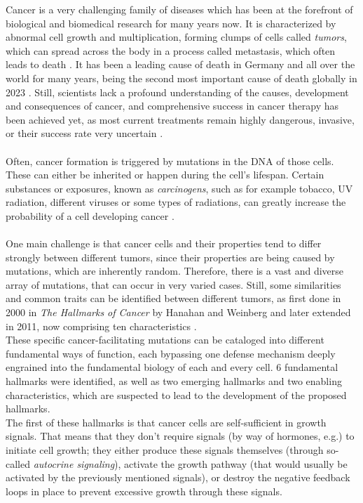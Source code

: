 Cancer is a very challenging family of diseases which has been at the forefront of biological and biomedical research for many years now. It is characterized by abnormal cell growth and multiplication, forming clumps of cells called \textit{tumors}, which can spread across the body in a process called metastasis, which often leads to death \cite{who-cancer}. It has been a leading cause of death in Germany and all over the world for many years, being the second most important cause of death globally in 2023 \cite{owid-causes-of-death}. Still, scientists lack a profound understanding of the causes, development and consequences of cancer, and comprehensive success in cancer therapy has been achieved yet, as most current treatments remain highly dangerous, invasive, or their success rate very uncertain \cite{side-effects-cancer-treatments, who-cancer} .\\~\\
Often, cancer formation is triggered by mutations in the DNA of those cells. These can either be inherited or happen during the cell's lifespan. Certain substances or exposures, known as \textit{carcinogens}, such as for example tobacco, UV radiation, different viruses or some types of radiations, can greatly increase the probability of a cell developing cancer \cite{carcinogens}.\\~\\
One main challenge is that cancer cells and their properties tend to differ strongly between different tumors, since their properties are being caused by mutations, which are inherently random. Therefore, there is a vast and diverse array of mutations, that can occur in very varied cases. Still, some similarities and common traits can be identified between different tumors, as first done in 2000 in \textit{The Hallmarks of Cancer} by Hanahan and Weinberg \cite{hallmarks-of-cancer} and later extended in 2011, now comprising ten characteristics \cite{hallmarks-of-cancer-next-generation}.\\
These specific cancer-facilitating mutations can be cataloged into different fundamental ways of function, each bypassing one defense mechanism deeply engrained into the fundamental biology of each and every cell. 6 fundamental hallmarks were identified, as well as two emerging hallmarks and two enabling characteristics, which are suspected to lead to the development of the proposed hallmarks.\\
The first of these hallmarks is that cancer cells are self-sufficient in growth signals. That means that they don't require signals (by way of hormones, e.g.) to initiate cell growth; they either produce these signals themselves (through so-called \textit{autocrine signaling}), activate the growth pathway (that would usually be activated by the previously mentioned signals), or destroy the negative feedback loops in place to prevent excessive growth through these signals.\\
